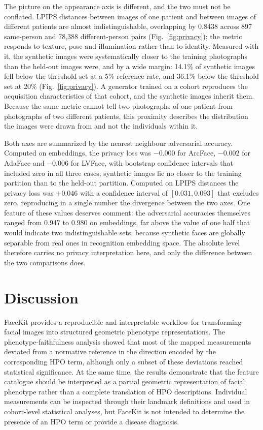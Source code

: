 \documentclass[11pt]{article}
\begin{document}
The picture on the appearance axis is different, and the two must not be
conflated. LPIPS distances between images of one patient and between images of
different patients are almost indistinguishable, overlapping by 0.8438 across
897 same-person and 78,388 different-person pairs
(Fig.~\ref{fig:privacy}); the metric responds to
texture, pose and illumination rather than to identity. Measured with it, the
synthetic images were systematically closer to the training photographs than the
held-out images were, and by a wide margin: 14.1\% of synthetic images fell
below the threshold set at a 5\% reference rate, and 36.1\% below the threshold
set at 20\% (Fig.~\ref{fig:privacy}). %
A generator trained on a cohort reproduces the acquisition characteristics of
that cohort, and the synthetic images inherit them. Because the same metric
cannot tell two photographs of one patient from photographs of two different
patients, this proximity describes the distribution the images were drawn from
and not the individuals within it.

Both axes are summarized by the nearest neighbour adversarial accuracy.
Computed on embeddings, the privacy loss was $-0.000$ for ArcFace, $-0.002$ for
AdaFace and $-0.006$ for LVFace, with bootstrap confidence intervals that
included zero in all three cases; %
synthetic images lie no closer to the training partition than to the held-out
partition. Computed on LPIPS distances the privacy loss was $+0.046$ with a
confidence interval of $[0.031, 0.093]$ that excludes zero, %
reproducing in a single number the divergence between the two axes. One feature
of these values deserves comment: the adversarial accuracies themselves ranged
from 0.947 to 0.980 on embeddings, %
far above the value of one half that would indicate two indistinguishable sets,
because synthetic faces are globally separable from real ones in recognition
embedding space. The absolute level therefore carries no privacy
interpretation here, and only the difference between the two comparisons does.


\section{Discussion}

FaceKit provides a reproducible and interpretable workflow for transforming facial images into structured geometric phenotype representations. The phenotype-faithfulness analysis showed that most of the mapped measurements deviated from a normative reference in the direction encoded by the corresponding HPO term, although only a subset of these deviations reached statistical significance. At the same time, the results demonstrate that the feature catalogue should be interpreted as a partial geometric representation of facial phenotype rather than a complete translation of HPO descriptions. Individual measurements can be inspected through their landmark definitions and used in cohort-level statistical analyses, but FaceKit is not intended to determine the presence of an HPO term or provide a disease diagnosis.
\end{document}
